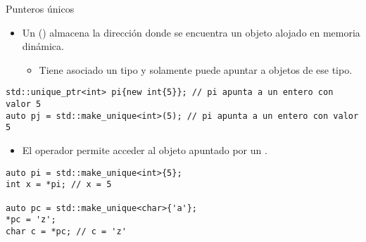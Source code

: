 \begin{frame}[t,fragile]{Punteros únicos}
\begin{itemize}
  \item Un  () almacena la dirección
        donde se encuentra un objeto alojado en memoria dinámica.
    \begin{itemize}
      \item Tiene asociado un tipo y solamente puede apuntar a objetos de ese tipo.
    \end{itemize}
\end{itemize}
\begin{lstlisting}
std::unique_ptr<int> pi{new int{5}}; // pi apunta a un entero con valor 5
auto pj = std::make_unique<int>(5); // pi apunta a un entero con valor 5
\end{lstlisting}

\begin{itemize}
  \item El operador \cppkey{*} permite acceder al objeto apuntado por un 
        .
\end{itemize}
\begin{lstlisting}
auto pi = std::make_unique<int>{5};
int x = *pi; // x = 5

auto pc = std::make_unique<char>{'a'};
*pc = 'z'; 
char c = *pc; // c = 'z'
\end{lstlisting}
\end{frame}

